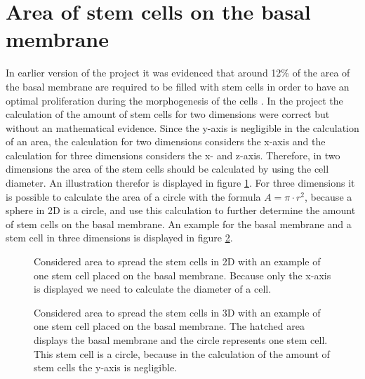 \section{Area of stem cells on the basal membrane}
In earlier version of the project it was evidenced that around 12\% of the area of the basal membrane are required to be filled with stem cells in order to have an optimal proliferation during the morphogenesis of the cells \cite{Torelli2017}.
In the project the calculation of the amount of stem cells for two dimensions were correct but without an mathematical evidence. \newline
Since the y-axis is negligible in the calculation of an area, the calculation for two dimensions considers the x-axis and the calculation for three dimensions considers the x- and z-axis. Therefore, in two dimensions the area of the stem cells should be calculated by using the cell diameter. An illustration therefor is displayed in figure \ref{tikz:AreaIn2D}. For three dimensions it is possible to calculate the area of a circle with the formula $A = \pi \cdot r^{2}$, because a sphere in 2D is a circle, and use this calculation to further determine the amount of stem cells on the basal membrane. An example for the basal membrane and a stem cell in three dimensions is displayed in figure \ref{tikz:AreaIn3D}. 

\begin{figure}[h]
\begin{center}
\caption{Considered area to spread the stem cells in 2D with an example of one stem cell placed on the basal membrane. Because only the x-axis is displayed we need to calculate the diameter of a cell.}
\label{tikz:AreaIn2D}
\end{center}
\end{figure}


\begin{figure}[h]
\begin{center}
\caption{Considered area to spread the stem cells in 3D with an example of one stem cell placed on the basal membrane. The hatched area displays the basal membrane and the circle represents one stem cell. This stem cell is a circle, because in the calculation of the amount of stem cells the y-axis is negligible.}
\label{tikz:AreaIn3D}
\end{center}
\end{figure}


